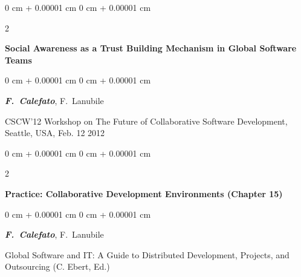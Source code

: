 \documentclass[10pt, a4paper]{article}
\newenvironment{onecolentry}{
    \begin{adjustwidth}{
        0 cm + 0.00001 cm
    }{
        0 cm + 0.00001 cm
    }
}{
    \end{adjustwidth}
} %
\newenvironment{twocolentry}[2][]{
    \onecolentry
    \def\secondColumn{#2}
    \setcolumnwidth{\fill, 4.5 cm}
    \begin{paracol}{2}
}{
    \switchcolumn \raggedleft \secondColumn
    \end{paracol}
    \endonecolentry
} %
\begin{document}
        \begin{samepage}
            \begin{twocolentry}{
                2012
            }
                \textbf{Social Awareness as a Trust Building Mechanism in Global Software Teams}
            \end{twocolentry}

            \vspace{0.10 cm}
            
            \begin{onecolentry}
                \mbox{\textbf{\textit{F. Calefato}}}, \mbox{F. Lanubile}

                \vspace{0.10 cm}
                
        CSCW'12 Workshop on The Future of Collaborative Software Development, Seattle, USA, Feb. 12 2012\end{onecolentry}
        \end{samepage}

        \vspace{0.2 cm}

        \begin{samepage}
            \begin{twocolentry}{
                2011
            }
                \textbf{Practice: Collaborative Development Environments (Chapter 15)}
            \end{twocolentry}

            \vspace{0.10 cm}
            
            \begin{onecolentry}
                \mbox{\textbf{\textit{F. Calefato}}}, \mbox{F. Lanubile}

                \vspace{0.10 cm}
                
        Global Software and IT: A Guide to Distributed Development, Projects, and Outsourcing (C. Ebert, Ed.)\end{onecolentry}
        \end{samepage}

        \vspace{0.2 cm}
\end{document}
